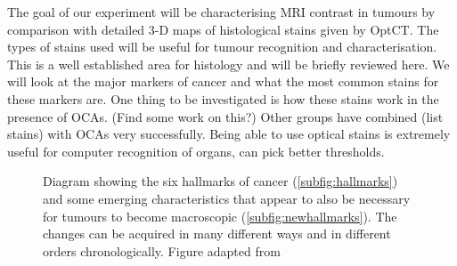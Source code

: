 \documentclass[12pt]{article}
\begin{document}
The goal of our experiment will be characterising MRI contrast in tumours by comparison with detailed 3-D maps of histological stains given by OptCT. The types of stains used will be useful for tumour recognition and characterisation. This is a well established area for histology and will be briefly reviewed here. We will look at the major markers of cancer and what the most common stains for these markers are. One thing to be investigated is how these stains work in the presence of OCAs. (Find some work on this?) Other groups have combined (list stains) with OCAs very successfully. 
Being able to use optical stains is extremely useful for computer recognition of organs, can pick better thresholds. \cite{Sharpe:2003cm}





\begin{figure}[H]
\centering
{}
\caption{Diagram showing the six hallmarks of cancer (\ref{subfig:hallmarks}) and some emerging characteristics that appear to also be necessary for tumours to become macroscopic (\ref{subfig:newhallmarks}). The changes can be acquired in many different ways and in different orders chronologically. Figure adapted from \cite{Hanahan:2011gua}}
\label{fig:hallmarks2011}
\end{figure}
\end{document}
